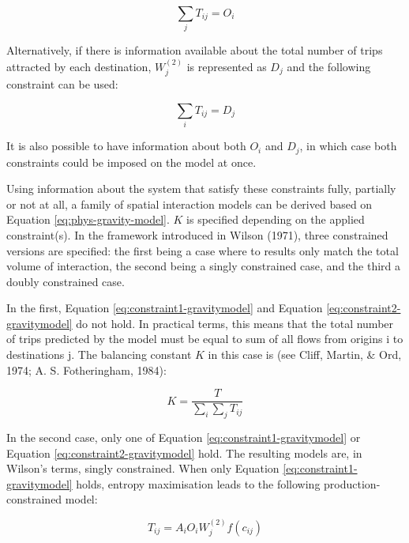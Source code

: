 \documentclass[
11pt, %
oneside, %
english, %
singlespacing, %
]{macthesis} %
\begin{document}
\begin{equation}
\label{eq:constraint1-gravitymodel}
\sum_j T_{ij} = O_i
\end{equation} 

Alternatively, if there is information available about the total number of trips attracted by each destination, \(W_j^{(2)}\) is represented as \(D_j\) and the following constraint can be used:

\begin{equation}
\label{eq:constraint2-gravitymodel}
\sum_i T_{ij} = D_j
\end{equation} 

It is also possible to have information about both \(O_i\) and \(D_j\), in which case both constraints could be imposed on the model at once.

Using information about the system that satisfy these constraints fully, partially or not at all, a family of spatial interaction models can be derived based on Equation \ref{eq:phys-gravity-model}. \(K\) is specified depending on the applied constraint(s). In the framework introduced in Wilson (1971), three constrained versions are specified: the first being a case where to results only match the total volume of interaction, the second being a singly constrained case, and the third a doubly constrained case.

In the first, Equation \ref{eq:constraint1-gravitymodel} and Equation \ref{eq:constraint2-gravitymodel} do not hold. In practical terms, this means that the total number of trips predicted by the model must be equal to sum of all flows from origins i to destinations j. The balancing constant \(K\) in this case is (see Cliff, Martin, \& Ord, 1974; A. S. Fotheringham, 1984):

\begin{equation}
\label{eq:total-flow-balancing-factor}
K=\frac{T}{\sum_i\sum_j T_{ij}}
\end{equation} 

In the second case, only one of Equation \ref{eq:constraint1-gravitymodel} or Equation \ref{eq:constraint2-gravitymodel} hold. The resulting models are, in Wilson's terms, singly constrained. When only Equation \ref{eq:constraint1-gravitymodel} holds, entropy maximisation leads to the following production-constrained model:

\begin{equation}
\label{eq:production-constrained-gravitymodel}
T_{ij} = A_i O_i W_j^{(2)} f(c_{ij})
\end{equation} 
\end{document}
